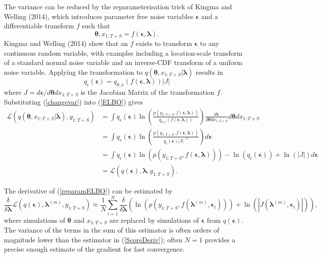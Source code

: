 \documentclass[12pt,a4paper]{article}%
\numberwithin{equation}{section}
\begin{document}
The variance can be reduced by the reparameterisation trick of Kingma and Welling (2014), which introduces parameter free noise variables $\boldsymbol{\epsilon}$ and a differentiable transform $f$ such that
\begin{equation}
\label{Reparam}
\boldsymbol{\theta}, x_{1:T+S} = f(\boldsymbol{\epsilon}, \boldsymbol{\lambda}).
\end{equation}
Kingma and Welling (2014) show that an $f$ exists to transform $\boldsymbol{\epsilon}$ to any continuous random variable, with examples including a location-scale transform of a standard normal noise variable and an inverse-CDF transform of a uniform noise variable. Applying the transformation to $q(\boldsymbol{\theta}, x_{1:T+S} | \boldsymbol{\lambda})$ results in
\begin{equation}
\label{changevar}
q_{\epsilon}(\boldsymbol{\epsilon}) = q_{\theta, x}(f (\boldsymbol{\epsilon}, \boldsymbol{\lambda})) |J|
\end{equation}
where $J = d\boldsymbol{\epsilon}/d\boldsymbol{\theta}dx_{1:T+S}$ is the Jacobian Matrix of the transformation $f$. Substituting (\ref{changevar}) into (\ref{ELBO}) gives
\begin{align}
\mathcal{L}(q(\boldsymbol{\theta}, x_{1:T+S} | \boldsymbol{\lambda}), y_{1:T+S}) &= \int q_{\epsilon}(\boldsymbol{\epsilon}) \ln \left( \frac{p(y_{1:T+S},f (\boldsymbol{\epsilon}, \boldsymbol{\lambda}))}{q_{\theta, x}(f (\boldsymbol{\epsilon}, \boldsymbol{\lambda}))} \right) \frac{ d\boldsymbol{\epsilon}}{d\boldsymbol{\theta}dx_{1:T+S}}d\boldsymbol{\theta}dx_{1:T+S} \nonumber \\
&= \int q_{\epsilon}(\boldsymbol{\epsilon}) \ln \left( \frac{p(y_{1:T+S},f (\boldsymbol{\epsilon}, \boldsymbol{\lambda}))}{q_{\epsilon}(\boldsymbol{\epsilon})|J|^{-1}} \right) d\boldsymbol{\epsilon}\nonumber \\
&= \int q_{\epsilon}(\boldsymbol{\epsilon}) \ln (p(y_{1:T+S},f (\boldsymbol{\epsilon}, \boldsymbol{\lambda}))) - \ln(q_{\epsilon}(\boldsymbol{\epsilon})) + \ln(|J|) d\boldsymbol{\epsilon}\nonumber \\
&= \mathcal{L}(q(\boldsymbol{\epsilon}), \boldsymbol{\lambda}, y_{1:T+S}). \label{reparamELBO}
\end{align}

The derivative of (\ref{reparamELBO}) can be estimated by
\begin{equation}
\label{ReparamDeriv}
\frac{\delta}{\delta\boldsymbol{\lambda}}\mathcal{L}(q(\boldsymbol{\epsilon}), \boldsymbol{\lambda}^{(m)}, y_{1:T+S}) \approx \frac{1}{N}\sum_{i=1}^{N} \frac{\delta}{\delta\boldsymbol{\lambda}} \left( \ln (p(y_{1:T+S}, f(\boldsymbol{\lambda}^{(m)}, \boldsymbol{\epsilon}_i))) + \ln(|J(\boldsymbol{\lambda}^{(m)}, \boldsymbol{\epsilon}_i)|) \right),
\end{equation}
where simulations of $\boldsymbol{\theta}$ and $x_{1:T+S}$ are replaced by simulations of $\boldsymbol{\epsilon}$ from $q(\boldsymbol{\epsilon})$. The variance of the terms in the sum of this estimator is often orders of magnitude lower than the estimator in (\ref{ScoreDeriv}); often $N = 1$ provides a precise enough estimate of the gradient for fast convergence.
\end{document}
